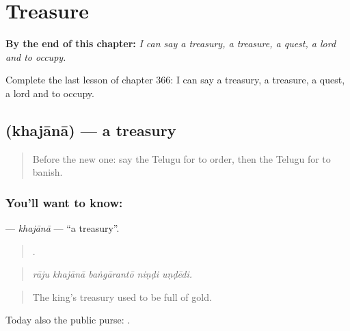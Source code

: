 
\chapter{Treasure}
\label{ch:te-treasure}

\begin{chapteropening}
\textbf{By the end of this chapter:} \emph{I can say a treasury, a treasure, a quest, a lord and to occupy.}

Complete the last lesson of chapter 366: I can say a treasury, a treasure, a quest, a lord and to occupy.
\end{chapteropening}

\section[\texorpdfstring{\te{ఖజానా} (khajānā)}{ఖజానా (khajānā)}]{ (khajānā) — a treasury}

\label{lesson:TE-C366-khajana}



\begin{quote}
Before the new one: say the Telugu for to order, then the Telugu for to banish.
\end{quote}

\subsection*{You'll want to know: }
\textbf{} — \emph{khajānā} — \textquotedblleft{}a treasury\textquotedblright{}.

\begin{quote}
    .
\end{quote}

\begin{quote}
\emph{rāju khajānā baṅgārantō niṇḍi uṇḍēdi.}
\end{quote}

\begin{quote}
The king's treasury used to be full of gold.
\end{quote}

Today also the public purse:  .

